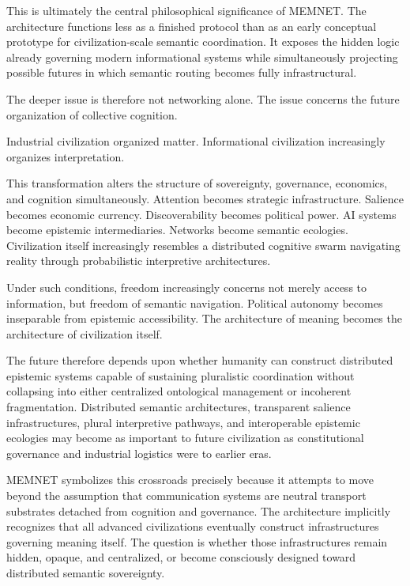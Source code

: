 \documentclass[11pt,a4paper]{article}
\begin{document}
This is ultimately the central philosophical significance of MEMNET. The architecture functions less as a finished protocol than as an early conceptual prototype for civilization-scale semantic coordination. It exposes the hidden logic already governing modern informational systems while simultaneously projecting possible futures in which semantic routing becomes fully infrastructural.

The deeper issue is therefore not networking alone. The issue concerns the future organization of collective cognition.

Industrial civilization organized matter. Informational civilization increasingly organizes interpretation.

This transformation alters the structure of sovereignty, governance, economics, and cognition simultaneously. Attention becomes strategic infrastructure. Salience becomes economic currency. Discoverability becomes political power. AI systems become epistemic intermediaries. Networks become semantic ecologies. Civilization itself increasingly resembles a distributed cognitive swarm navigating reality through probabilistic interpretive architectures.

Under such conditions, freedom increasingly concerns not merely access to information, but freedom of semantic navigation. Political autonomy becomes inseparable from epistemic accessibility. The architecture of meaning becomes the architecture of civilization itself.

The future therefore depends upon whether humanity can construct distributed epistemic systems capable of sustaining pluralistic coordination without collapsing into either centralized ontological management or incoherent fragmentation. Distributed semantic architectures, transparent salience infrastructures, plural interpretive pathways, and interoperable epistemic ecologies may become as important to future civilization as constitutional governance and industrial logistics were to earlier eras.

MEMNET symbolizes this crossroads precisely because it attempts to move beyond the assumption that communication systems are neutral transport substrates detached from cognition and governance. The architecture implicitly recognizes that all advanced civilizations eventually construct infrastructures governing meaning itself. The question is whether those infrastructures remain hidden, opaque, and centralized, or become consciously designed toward distributed semantic sovereignty.
\end{document}
